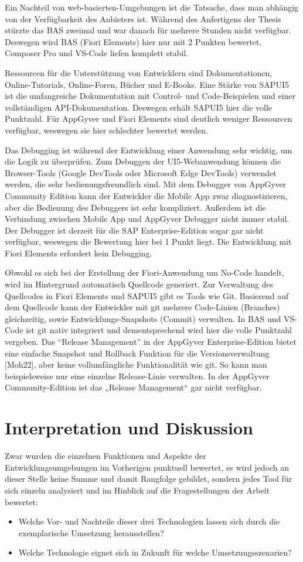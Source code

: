Ein Nachteil von web-basierten-Umgebungen ist die Tatsache, dass man abhängig von der Verfügbarkeit des Anbieters ist. Während des Anfertigens der Thesis stürzte das BAS zweimal und war danach für mehrere Stunden nicht verfügbar. Deswegen wird BAS (Fiori Elements) hier nur mit 2 Punkten bewertet. Composer Pro und VS-Code liefen komplett stabil.

Ressourcen für die Unterstützung von Entwicklern sind Dokumentationen, Online-Tutorials, Online-Foren, Bücher und E-Books. Eine Stärke von SAPUI5 ist die umfangreiche Dokumentation mit Control- und Code-Beispielen und einer vollständigen API-Dokumentation. Deswegen erhält SAPUI5 hier die volle Punktzahl. Für AppGyver und Fiori Elements sind deutlich weniger Ressourcen verfügbar, weswegen sie hier schlechter bewertet werden.

Das Debugging ist während der Entwicklung einer Anwendung sehr wichtig, um die Logik zu überprüfen. Zum Debuggen der UI5-Webanwendung können die Browser-Tools (Google DevTools oder Microsoft Edge DevTools) verwendet werden, die sehr bedienungsfreundlich sind. Mit dem Debugger von AppGyver Community Edition kann der Entwickler die Mobile App zwar diagnostizieren, aber die Bedienung des Debuggers ist sehr kompliziert. Außerdem ist die Verbindung zwischen Mobile App und AppGyver Debugger nicht immer stabil. Der Debugger ist derzeit für die SAP Enterprise-Edition sogar gar nicht verfügbar, weswegen die Bewertung hier bei 1 Punkt liegt. Die Entwicklung mit Fiori Elements erfordert kein Debugging.

Obwohl es sich bei der Erstellung der Fiori-Anwendung um No-Code handelt, wird im Hintergrund automatisch Quellcode generiert. Zur Verwaltung des Quellcodes in Fiori Elements und SAPUI5 gibt es Tools wie Git. Basierend auf dem Quellcode kann der Entwickler mit git mehrere Code-Linien (Branches) gleichzeitig, sowie Entwicklungs-Snapshots (Commit) verwalten. In BAS und VS-Code ist git nativ integriert und dementsprechend wird hier die volle Punktzahl vergeben. Das “Release Management” in der AppGyver Enterprise-Edition bietet eine einfache Snapshot und Rollback Funktion für die Versionsverwaltung [Moh22], aber keine vollumfängliche Funktionalität wie git. So kann man beispielsweise nur eine einzelne Release-Linie verwalten. In der AppGyver Community-Edition ist das „Release Management“ gar nicht verfügbar. 

\section{Interpretation und Diskussion}
Zwar wurden die einzelnen Funktionen und Aspekte der Entwicklungsumgebungen im Vorherigen punktuell bewertet, es wird jedoch an dieser Stelle keine Summe und damit Rangfolge gebildet, sondern jedes Tool für sich einzeln analysiert und im Hinblick auf die Fragestellungen der Arbeit bewertet:
\begin{itemize}[noitemsep]
\item Welche Vor- und Nachteile dieser drei Technologien lassen sich durch die exemplarische Umsetzung herausstellen? 
\item Welche Technologie eignet sich in Zukunft für welche Umsetzungsszenarien?
\end{itemize}

